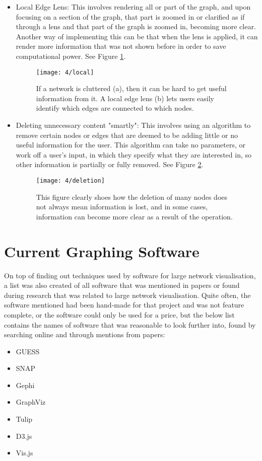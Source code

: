 \documentclass[../dissertation.tex]{subfiles}
\begin{document}
\begin{itemize}
    \item Local Edge Lens: This involves rendering all or part of the graph, and upon focusing on a section of the graph, that part is zoomed in or clarified as if through a lens and that part of the graph is zoomed in, becoming more clear. Another way of implementing this can be that when the lens is applied, it can render more information that was not shown before in order to save computational power. See Figure \ref{fig:local}.
    \begin{figure}
        \centering
        \texttt{[image: 4/local]}
        \caption{If a network is cluttered (a), then it can be hard to get useful information from it. A local edge lens (b) lets users easily identify which edges are connected to which nodes.}
        \label{fig:local}
    \end{figure}
    \item Deleting unnecessary content "smartly": This involves using an algorithm to remove certain nodes or edges that are deemed to be adding little or no useful information for the user. This algorithm can take no parameters, or work off a user's input, in which they specify what they are interested in, so other information is partially or fully removed. See Figure \ref{fig:deletion}.
    \begin{figure}
        \centering
        \texttt{[image: 4/deletion]}
        \caption{This figure clearly shoes how the deletion of many nodes does not always mean information is lost, and in some cases, information can become more clear as a result of the operation.}
        \label{fig:deletion}
    \end{figure}
\end{itemize}

\section{Current Graphing Software}

On top of finding out techniques used by software for large network visualisation, a list was also created of all software that was mentioned in papers or found during research that was related to large network visualisation. Quite often, the software mentioned had been hand-made for that project and was not feature complete, or the software could only be used for a price, but the below list contains the names of software that was reasonable to look further into, found by searching online and through mentions from papers:
\begin{itemize}
    \item GUESS
    \item SNAP
    \item Gephi
    \item GraphViz
    \item Tulip
    \item D3.js
    \item Vis.js
\end{itemize}
\end{document}
